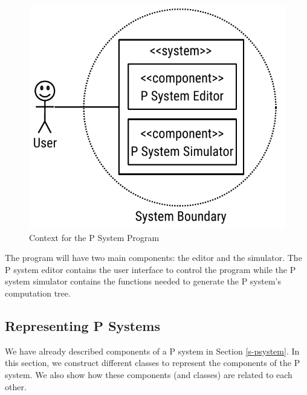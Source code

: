 \documentclass{article}
\begin{document}
\begin{figure}[H]
\begin{center}
    \includegraphics[scale=0.8]{figures/zzz-context-model.pdf}
    \caption{Context for the P System Program}
    \label{fig:context}
\end{center}
\end{figure}

The program will have two main components: the editor and the simulator. The P system editor
contains the user interface to control the program while the P system simulator contains the 
functions needed to generate the P system's computation tree.


\subsection{Representing P Systems}\label{s-represent}

We have already described components of a P system in Section \ref{s-psystem}. In this section, we
construct different classes to represent the components of the P system. We also show how these
components (and classes) are related to each other.
\end{document}
